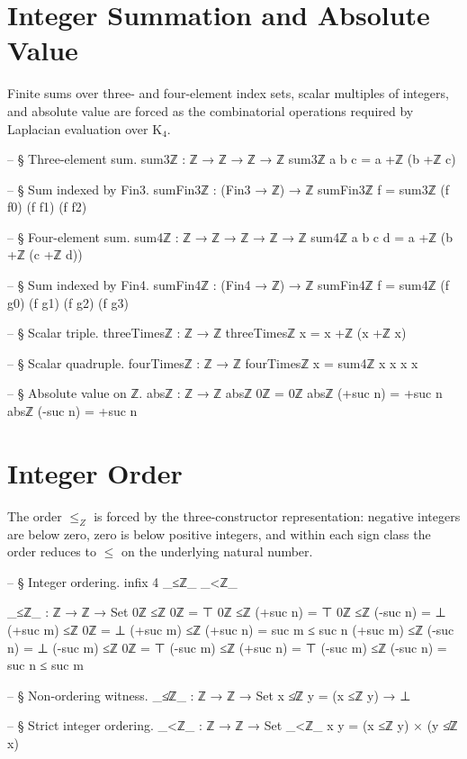 \documentclass[11pt,a4paper]{book}
\def\mathbb#1{#1}%
\begin{document}
\section{Integer Summation and Absolute Value}

Finite sums over three- and four-element index sets, scalar multiples of integers,
and absolute value are forced as the combinatorial operations required by Laplacian
evaluation over K$_4$.

\begin{code}
-- § Three-element sum.
sum3ℤ : ℤ → ℤ → ℤ → ℤ
sum3ℤ a b c = a +ℤ (b +ℤ c)

-- § Sum indexed by Fin3.
sumFin3ℤ : (Fin3 → ℤ) → ℤ
sumFin3ℤ f = sum3ℤ (f f0) (f f1) (f f2)

-- § Four-element sum.
sum4ℤ : ℤ → ℤ → ℤ → ℤ → ℤ
sum4ℤ a b c d = a +ℤ (b +ℤ (c +ℤ d))

-- § Sum indexed by Fin4.
sumFin4ℤ : (Fin4 → ℤ) → ℤ
sumFin4ℤ f = sum4ℤ (f g0) (f g1) (f g2) (f g3)

-- § Scalar triple.
threeTimesℤ : ℤ → ℤ
threeTimesℤ x = x +ℤ (x +ℤ x)

-- § Scalar quadruple.
fourTimesℤ : ℤ → ℤ
fourTimesℤ x = sum4ℤ x x x x

-- § Absolute value on ℤ.
absℤ : ℤ → ℤ
absℤ 0ℤ = 0ℤ
absℤ (+suc n) = +suc n
absℤ (-suc n) = +suc n
\end{code}

\section{Integer Order}

The order $\le_{\mathbb{Z}}$ is forced by the three-constructor representation:
negative integers are below zero, zero is below positive integers, and within each
sign class the order reduces to $\le$ on the underlying natural number.

\begin{code}
-- § Integer ordering.
infix 4 _≤ℤ_ _<ℤ_

_≤ℤ_ : ℤ → ℤ → Set
0ℤ ≤ℤ 0ℤ = ⊤
0ℤ ≤ℤ (+suc n) = ⊤
0ℤ ≤ℤ (-suc n) = ⊥
(+suc m) ≤ℤ 0ℤ = ⊥
(+suc m) ≤ℤ (+suc n) = suc m ≤ suc n
(+suc m) ≤ℤ (-suc n) = ⊥
(-suc m) ≤ℤ 0ℤ = ⊤
(-suc m) ≤ℤ (+suc n) = ⊤
(-suc m) ≤ℤ (-suc n) = suc n ≤ suc m

-- § Non-ordering witness.
_≰ℤ_ : ℤ → ℤ → Set
x ≰ℤ y = (x ≤ℤ y) → ⊥

-- § Strict integer ordering.
_<ℤ_ : ℤ → ℤ → Set
_<ℤ_ x y = (x ≤ℤ y) × (y ≰ℤ x)
\end{code}
\end{document}
